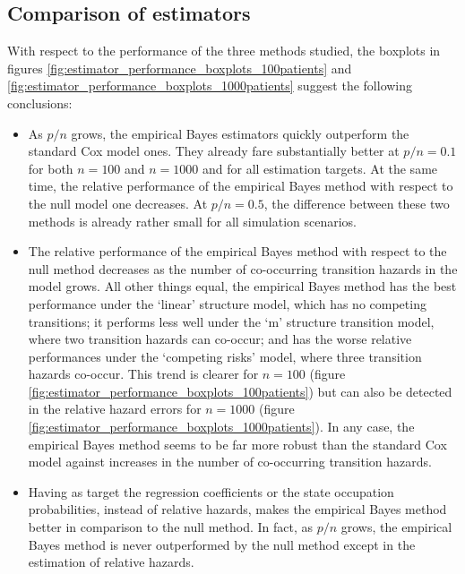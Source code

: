 \subsection{Comparison of estimators}
With respect to the performance of the three methods studied, the boxplots in figures \ref{fig:estimator_performance_boxplots_100patients} and \ref{fig:estimator_performance_boxplots_1000patients} suggest the following conclusions:
\begin{itemize}
\item As $p/n$ grows,  the empirical Bayes estimators quickly outperform the standard Cox model ones.  They already fare substantially better at $p/n=0.1$ for both $n=100$ and $n=1000$ and for all estimation targets.  At the same time, the relative performance of the empirical Bayes method with respect to the null model one decreases.  At $p/n=0.5$, the difference between these two methods is already rather small for all simulation scenarios. 
\item The relative performance of the empirical Bayes method with respect to the null method decreases as the number of co-occurring transition hazards in the model grows.  All other things equal, the empirical Bayes method has the best performance under the `linear' structure model, which has no competing transitions; it performs less well under the `m' structure transition model, where two transition hazards can co-occur; and has the worse relative performances under the `competing risks' model, where three transition hazards co-occur.  This trend is clearer for $n=100$ (figure \ref{fig:estimator_performance_boxplots_100patients}) but can also be detected in the relative hazard errors for $n=1000$ (figure \ref{fig:estimator_performance_boxplots_1000patients}).   In any case, the empirical Bayes method seems to be far more robust than the standard Cox model against increases in the number of co-occurring transition hazards.
\item Having as target the regression coefficients or the state occupation probabilities,  instead of relative hazards, makes the empirical Bayes method better in comparison to the null method. In fact, as $p/n$ grows, the empirical Bayes method is never outperformed by the null method except in the estimation of relative hazards.
\end{itemize}


